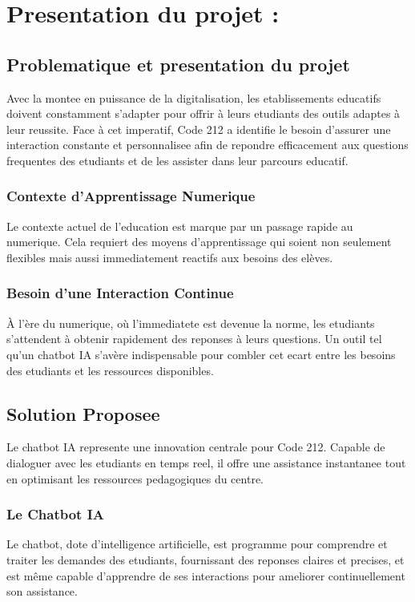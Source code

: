 \chapter{Presentation du projet :}

\section{Problematique et presentation du projet}
Avec la montee en puissance de la digitalisation, les etablissements educatifs doivent constamment s'adapter pour offrir à leurs etudiants des outils adaptes à leur reussite. Face à cet imperatif, Code 212 a identifie le besoin d'assurer une interaction constante et personnalisee afin de repondre efficacement aux questions frequentes des etudiants et de les assister dans leur parcours educatif.

\subsection{Contexte d'Apprentissage Numerique}
Le contexte actuel de l'education est marque par un passage rapide au numerique. Cela requiert des moyens d'apprentissage qui soient non seulement flexibles mais aussi immediatement reactifs aux besoins des elèves.

\subsection{Besoin d'une Interaction Continue}
À l'ère du numerique, où l'immediatete est devenue la norme, les etudiants s'attendent à obtenir rapidement des reponses à leurs questions. Un outil tel qu'un chatbot IA s'avère indispensable pour combler cet ecart entre les besoins des etudiants et les ressources disponibles.

\section{Solution Proposee}
Le chatbot IA represente une innovation centrale pour Code 212. Capable de dialoguer avec les etudiants en temps reel, il offre une assistance instantanee tout en optimisant les ressources pedagogiques du centre.

\subsection{Le Chatbot IA}
Le chatbot, dote d'intelligence artificielle, est programme pour comprendre et traiter les demandes des etudiants, fournissant des reponses claires et precises, et est même capable d'apprendre de ses interactions pour ameliorer continuellement son assistance.

